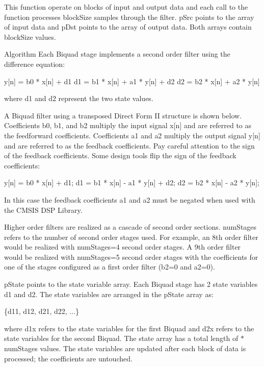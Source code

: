 This function operate on blocks of input and output data and each call to the function processes {\ttfamily block\+Size} samples through the filter. {\ttfamily p\+Src} points to the array of input data and {\ttfamily p\+Dst} points to the array of output data. Both arrays contain {\ttfamily block\+Size} values.

\begin{DoxyParagraph}{Algorithm}
Each Biquad stage implements a second order filter using the difference equation\+: 
\begin{DoxyPre}
   y[n] = b0 * x[n] + d1
   d1 = b1 * x[n] + a1 * y[n] + d2
   d2 = b2 * x[n] + a2 * y[n]
\end{DoxyPre}
 where d1 and d2 represent the two state values.
\end{DoxyParagraph}
\begin{DoxyParagraph}{}
A Biquad filter using a transposed Direct Form II structure is shown below. Coefficients {\ttfamily b0, b1, and b2 } multiply the input signal {\ttfamily x\mbox{[}n\mbox{]}} and are referred to as the feedforward coefficients. Coefficients {\ttfamily a1} and {\ttfamily a2} multiply the output signal {\ttfamily y\mbox{[}n\mbox{]}} and are referred to as the feedback coefficients. Pay careful attention to the sign of the feedback coefficients. Some design tools flip the sign of the feedback coefficients\+: 
\begin{DoxyPre}
   y[n] = b0 * x[n] + d1;
   d1 = b1 * x[n] - a1 * y[n] + d2;
   d2 = b2 * x[n] - a2 * y[n];
\end{DoxyPre}
 In this case the feedback coefficients {\ttfamily a1} and {\ttfamily a2} must be negated when used with the C\+M\+S\+IS D\+SP Library.
\end{DoxyParagraph}
\begin{DoxyParagraph}{}
Higher order filters are realized as a cascade of second order sections. {\ttfamily num\+Stages} refers to the number of second order stages used. For example, an 8th order filter would be realized with {\ttfamily num\+Stages=4} second order stages. A 9th order filter would be realized with {\ttfamily num\+Stages=5} second order stages with the coefficients for one of the stages configured as a first order filter ({\ttfamily b2=0} and {\ttfamily a2=0}).
\end{DoxyParagraph}
\begin{DoxyParagraph}{}
{\ttfamily p\+State} points to the state variable array. Each Biquad stage has 2 state variables {\ttfamily d1} and {\ttfamily d2}. The state variables are arranged in the {\ttfamily p\+State} array as\+: 
\begin{DoxyPre}
    \{d11, d12, d21, d22, ...\}
\end{DoxyPre}
 where {\ttfamily d1x} refers to the state variables for the first Biquad and {\ttfamily d2x} refers to the state variables for the second Biquad. The state array has a total length of {$\ast$num\+Stages} values. The state variables are updated after each block of data is processed; the coefficients are untouched.
\end{DoxyParagraph}
